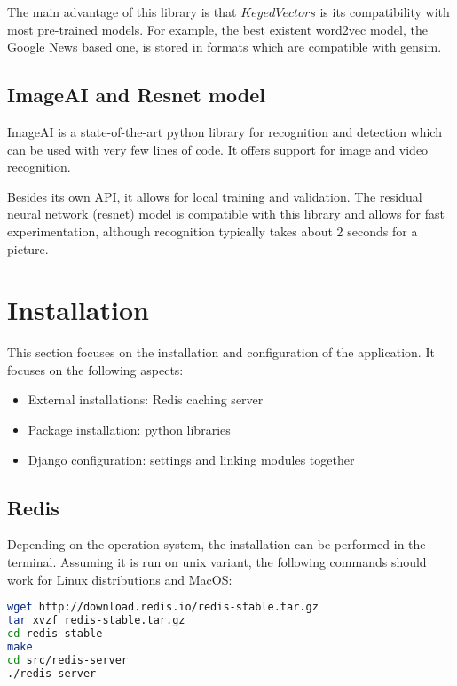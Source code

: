 The main advantage of this library is that $KeyedVectors$ is its compatibility with most pre-trained models. For example, the best existent word2vec model, the Google News based one, is stored in formats which are compatible with gensim.

\subsection{ImageAI and Resnet model}
\label{subsec:app_libraries_imageai}

ImageAI is a state-of-the-art python library for recognition and detection which can be used with very few lines of code. It offers support for image and video recognition. 

Besides its own API, it allows for local training and validation. The residual neural network (resnet) model is compatible with this library and allows for fast experimentation, although recognition typically takes about 2 seconds for a picture.

\section{Installation}
\label{sec:app_install}

This section focuses on the installation and configuration of the application. It focuses on the following aspects:

\begin{itemize}
\item{External installations: Redis caching server}
\item{Package installation: python libraries}
\item{Django configuration: settings and linking modules together}
\end{itemize}

\subsection{Redis}
\label{subsec:app_install_redis}

Depending on the operation system, the installation can be performed in the terminal. Assuming it is run on unix variant, the following commands should work for Linux distributions and MacOS:

\begin{lstlisting}[language=Bash]
wget http://download.redis.io/redis-stable.tar.gz
tar xvzf redis-stable.tar.gz
cd redis-stable
make
cd src/redis-server
./redis-server
\end{lstlisting}

